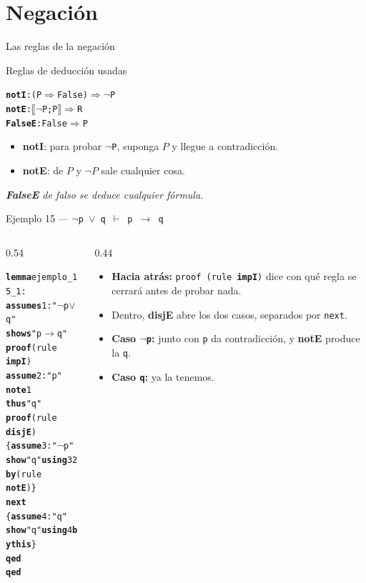 \documentclass[11pt,aspectratio=169]{beamer}
\newcommand{\sOr}{\(\vee\)}
\newcommand{\sNot}{\(\neg\)}
\newcommand{\sImp}{\(\longrightarrow\)}
\newcommand{\sMeta}{\(\Longrightarrow\)}
\newcommand{\sTurn}{\(\vdash\)}
\newcommand{\sLb}{\(\llbracket\)}
\newcommand{\sRb}{\(\rrbracket\)}
\newcommand{\kw}[1]{\textcolor{isaCmd}{\textbf{#1}}}
\newcommand{\str}[1]{\textcolor{isaStr}{#1}}
\newcommand{\Rn}[1]{\textcolor{granate}{\textbf{#1}}}
\newcommand{\R}[1]{{\setlength{\fboxsep}{1pt}%
  \colorbox{resalte}{\ttfamily\bfseries\textcolor{granate}{#1}}}}
\newcommand{\nota}[1]{{\small\itshape\color{gray} #1}}
\begin{document}
\section{Negación}

\begin{frame}[fragile]{Las reglas de la negación}
  \begin{block}{Reglas de deducción usadas}
\begin{alltt}\footnotesize
\Rn{notI}:   (P \sMeta{} False) \sMeta{} \sNot P
\Rn{notE}:   \sLb\sNot P; P\sRb{} \sMeta{} R
\Rn{FalseE}: False \sMeta{} P
\end{alltt}
\end{block}
  
  \begin{itemize}
    \item \Rn{notI}: para probar \texttt{\sNot P}, suponga $P$ y llegue a
      contradicción.
    
    \item \Rn{notE}: de $P$ y $\neg P$ sale \alert{cualquier cosa}.
  \end{itemize}
  \vfill
  
  \nota{\Rn{FalseE} de falso se deduce cualquier fórmula.}
\end{frame}

\begin{frame}[fragile]{Ejemplo 15 --- \texttt{\sNot p \sOr{} q \sTurn{} p \sImp{} q}}
  \begin{columns}[T]
    \begin{column}{0.54\textwidth}
\begin{alltt}\footnotesize
\kw{lemma} ejemplo_15_1:
  \kw{assumes} 1: \str{"\sNot p \sOr{} q"}
  \kw{shows} \str{"p \sImp{} q"}
\kw{proof} (rule \R{impI})
  \kw{assume} 2: \str{"p"}
  \kw{note} 1
  \kw{thus} \str{"q"}
  \kw{proof} (rule \R{disjE})
    \{ \kw{assume} 3: \str{"\sNot p"}
      \kw{show} \str{"q"} \kw{using} 3 2 \kw{by} (rule \R{notE}) \}
  \kw{next}
    \{ \kw{assume} 4: \str{"q"}
      \kw{show} \str{"q"} \kw{using} 4 \kw{by} \kw{this} \}
  \kw{qed}
\kw{qed}
\end{alltt}
    \end{column}
    \begin{column}{0.44\textwidth}
      \footnotesize
      \begin{itemize}
        \item<2-> \textbf{Hacia atrás:} \texttt{proof (rule \Rn{impI})}
          dice con qué regla se cerrará \alert{antes} de probar nada.
        \item<3-> Dentro, \Rn{disjE} abre los dos casos, separados por
          \texttt{next}.
        \item<4-> \textbf{Caso \texttt{\sNot p}:} junto con \texttt{p} da
          contradicción, y \Rn{notE} produce la \texttt{q}.
        \item<5-> \textbf{Caso \texttt{q}:} ya la tenemos.
      \end{itemize}
    \end{column}
  \end{columns}
\end{frame}
\end{document}
